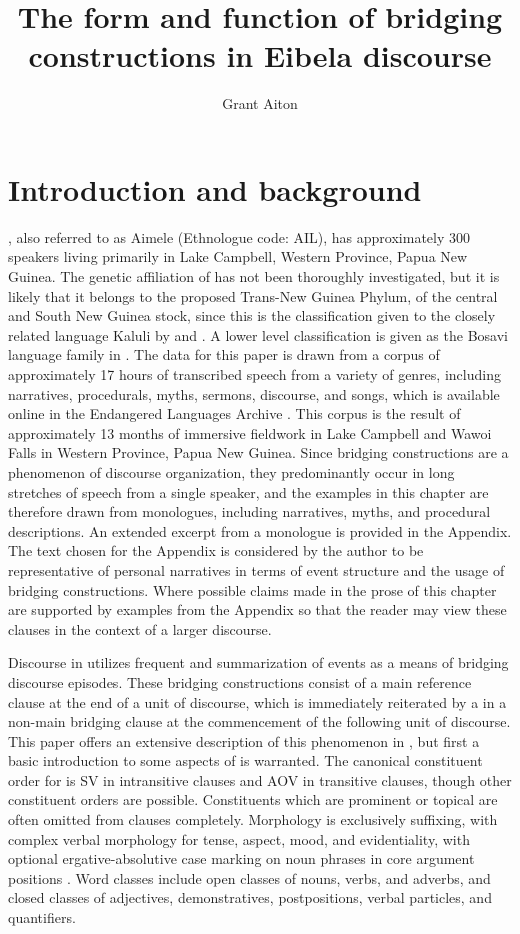 \documentclass[output=paper]{LSP/langsci}
\author{Grant Aiton\affiliation{James Cook University}}
\title{The form and function of bridging constructions in Eibela discourse}
\begin{document}
\label{ch:6}

\section{Introduction and background} 
\label{AiIntroduction}
, also referred to as Aimele (Ethnologue code: AIL), has approximately 300 speakers living primarily in Lake Campbell, Western Province, Papua New Guinea. The genetic affiliation of  has not been thoroughly investigated, but it is likely that it belongs to the proposed Trans-New Guinea Phylum, of the central and South New Guinea stock, since this is the classification given to the closely related language Kaluli by \citet{wurm78} and \citet{voorhoeve68}. A lower level classification is given as the Bosavi language family in \citet{shaw86}. The data for this paper is drawn from a corpus of approximately 17 hours of transcribed speech from a variety of genres, including narratives, procedurals, myths, sermons, discourse, and songs, which is available online in the Endangered Languages Archive \citep{Aiton.2016}. This corpus is the result of approximately 13 months of immersive fieldwork in Lake Campbell and Wawoi Falls in Western Province, Papua New Guinea. Since bridging constructions are a phenomenon of discourse organization, they predominantly occur in long stretches of speech from a single speaker, and the examples in this chapter are therefore drawn from monologues, including narratives, myths, and procedural descriptions. An extended excerpt from a monologue is provided in the Appendix. The text chosen for the Appendix is considered by the author to be representative of personal narratives in terms of event structure and the usage of bridging constructions. Where possible claims made in the prose of this chapter are supported by examples from the Appendix so that the reader may view these clauses in the context of a larger discourse.

Discourse in  utilizes frequent  and summarization of events as a means of bridging discourse episodes. These bridging constructions consist of a main reference clause at the end of a unit of discourse, which is immediately reiterated by a  in a non-main bridging clause at the commencement of the following unit of discourse. This paper offers an extensive description of this phenomenon in , but first a basic introduction to some aspects of  is warranted. The canonical constituent order for  is SV in intransitive clauses and AOV in transitive clauses, though other constituent orders are possible. Constituents which are prominent or topical are often omitted from clauses completely. Morphology is exclusively suffixing, with complex verbal morphology for tense, aspect, mood, and evidentiality, with optional ergative-absolutive case marking on noun phrases in core argument positions \citep[see][]{Aiton.2014}. Word classes include open classes of nouns, verbs, and adverbs, and closed classes of adjectives, demonstratives, postpositions, verbal particles, and quantifiers.
\end{document}
